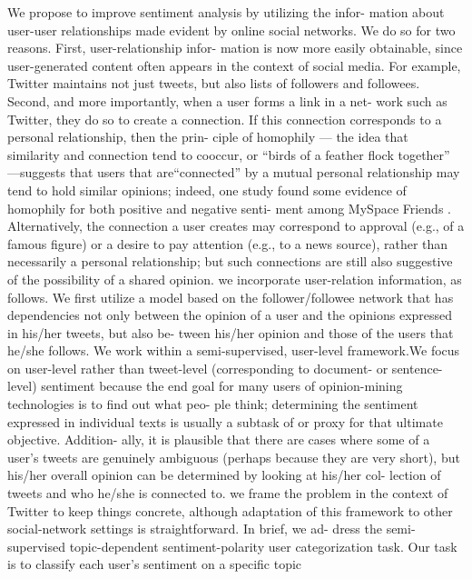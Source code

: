 \documentclass[runningheads,a4paper]{llncs}
\begin{document}
We propose to improve sentiment analysis by utilizing the infor-
mation about user-user relationships made evident by online social networks. We do so for two reasons. First, user-relationship infor- mation is now more easily obtainable, since user-generated content often appears in the context of social media. For example, Twitter maintains not just tweets, but also lists of followers and followees. Second, and more importantly, when a user forms a link in a net- work such as Twitter, they do so to create a connection. If this connection corresponds to a personal relationship, then the prin- ciple of homophily \cite{lazarsfeld_friendship_1954} — the idea that similarity and connection tend to cooccur, or ``birds of a feather flock together'' \cite{mcpherson2001birds} —suggests that users that are``connected'' by a mutual personal relationship may tend to hold similar opinions; indeed, one study found some evidence of homophily for both positive and negative senti- ment among MySpace Friends \cite{thelwall2010emotion}. Alternatively, the connection a user creates may correspond to approval (e.g., of a famous figure) or a desire to pay attention (e.g., to a news source), rather than necessarily a personal relationship; but such connections are still also suggestive of the possibility of a shared opinion.
we incorporate user-relation information, as follows. We first utilize a model based on the follower/followee network that has dependencies not only between the opinion of a user and the opinions expressed in his/her tweets, but also be- tween his/her opinion and those of the users that he/she follows.
We work within a semi-supervised, user-level framework.We focus on user-level rather than tweet-level (corresponding to document- or sentence-level) sentiment because the end goal for many users of opinion-mining technologies is to find out what peo- ple think; determining the sentiment expressed in individual texts is usually a subtask of or proxy for that ultimate objective. Addition- ally, it is plausible that there are cases where some of a user’s tweets are genuinely ambiguous (perhaps because they are very short), but his/her overall opinion can be determined by looking at his/her col- lection of tweets and who he/she is connected to.\cite{tan2011user}
we frame the problem in the context of Twitter to keep things concrete, although adaptation of this framework to other social-network settings is straightforward. In brief, we ad- dress the semi-supervised topic-dependent sentiment-polarity user categorization task.
Our task is to classify each user’s sentiment on a specific topic
\end{document}
